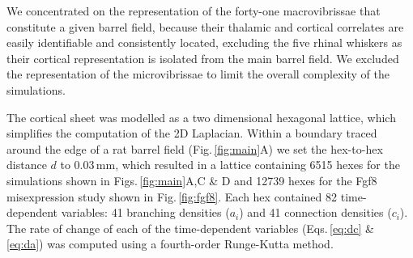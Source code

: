 \documentclass[9pt,lineno]{elife}
\newcommand{\cmnt}[1]{\textcolor{colcmnt}{#1}}
\begin{document}
\cmnt{We concentrated on the representation of the forty-one macrovibrissae
  that constitute a given barrel field, because their thalamic and cortical
  correlates are easily identifiable and consistently located, excluding the
  five rhinal whiskers as their cortical representation is isolated from the
  main barrel field. We excluded the representation of the microvibrissae to
  limit the overall complexity of the simulations.}

The cortical sheet was modelled as a two dimensional hexagonal lattice, which
simplifies the computation of the 2D Laplacian. Within a boundary traced
around the edge of a rat barrel field (Fig.\,\ref{fig:main}A) we set the
hex-to-hex distance $d$ to 0.03\,mm, which resulted in a lattice containing
6515 hexes for the simulations shown in Figs.\,\ref{fig:main}A,C \& D and
12739 hexes for the Fgf8 misexpression study shown in
Fig.\,\ref{fig:fgf8}. Each hex contained 82 time-dependent variables: 41
branching densities ($a_i$) and 41 connection densities ($c_i$).  The rate of
change of each of the time-dependent variables (Eqs.\,\ref{eq:dc} \&
\ref{eq:da}) was computed using a fourth-order Runge-Kutta method.
\end{document}
